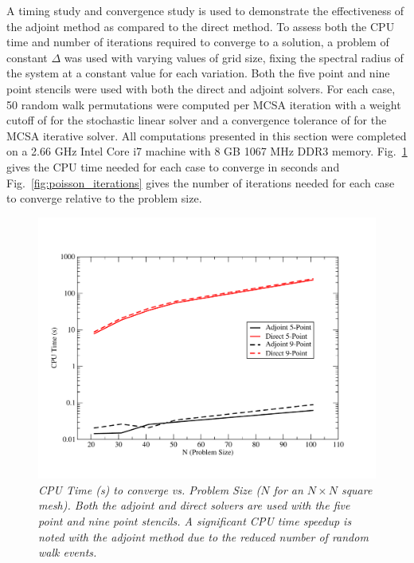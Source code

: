 \documentclass[preprint,12pt]{elsarticle}
\begin{document}
A timing study and convergence study is used to demonstrate the effectiveness
of the adjoint method as compared to the direct method. To assess both the CPU
time and number of iterations required to converge to a solution, a problem of
constant $\Delta$ was used with varying values of grid size, fixing the
spectral radius of the system at a constant value for each variation. Both the
five point and nine point stencils were used with both the direct and adjoint
solvers. For each case, 50 random walk permutations were computed per MCSA
iteration with a weight cutoff of  for the stochastic linear solver
and a convergence tolerance of  for the MCSA iterative solver. All
computations presented in this section were completed on a 2.66 GHz Intel Core
i7 machine with 8 GB 1067 MHz DDR3 memory. Fig.~\ref{fig:poisson_cpu_time}
gives the CPU time needed for each case to converge in seconds and
Fig.~\ref{fig:poisson_iterations} gives the number of iterations needed for
each case to converge relative to the problem size.
\begin{figure}[h!]
  \centering
  \includegraphics[width=5in,clip]{Adjoint_Direct_CPU_Time.pdf}
  \caption{\sl CPU Time (s) to converge vs. Problem Size ($N$ for an
    $N \times N$ square mesh). Both the adjoint and direct solvers are
    used with the five point and nine point stencils. A significant
    CPU time speedup is noted with the adjoint method due to the
    reduced number of random walk events.}
  \label{fig:poisson_cpu_time}
\end{figure}
\end{document}
